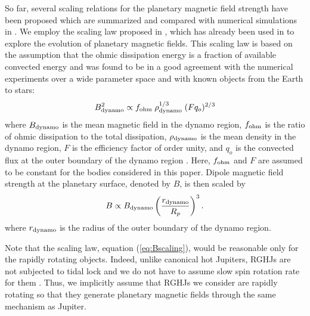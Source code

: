 \documentclass{emulateapj}
\def\memoYF#1{\color{red}$[${\bf #1}$]$ \color{black}}
\begin{document}
So far, several scaling relations for the planetary magnetic field strength  
have been proposed \citep[e.g.][]{russel1978,busse1976,stevenson1979,mizutani1992,sano1993,starchenko2002,christensen2006,christensen_et_al2009} %
which are summarized and compared with numerical simulations in \citet{christensen2010}. 
We employ the scaling law proposed in \citet{christensen_et_al2009}, which has already been used in \citet{reiners2010} to explore the evolution of planetary magnetic fields. This scaling law is based on the assumption that the ohmic dissipation energy is a fraction of available convected energy and was found to be in a good agreement with the numerical experiments over a wide parameter space and with known objects from the Earth to stars: 
\begin{equation}
B_{\rm dynamo} ^2 \propto f_{\rm ohm}\;\rho_{\rm dynamo}  ^{1/3} \;  (Fq_o)^{2/3} \label{eq:Bscaling} 
\end{equation}
where $B_{\rm dynamo}$ is the mean magnetic field in the dynamo region, $f_{\rm ohm}$ is the ratio of ohmic dissipation to the total dissipation, $\rho_{\rm dynamo} $ is the mean density in the dynamo region, $F$ is the efficiency factor of order unity, and $q_o$ is the convected flux at the outer boundary of the dynamo region \citep[see][for the comprehensive description]{christensen_et_al2009}. 
Here, $f_{\rm ohm}$ and $F$ are assumed to be constant for the bodies considered in this paper. 
Dipole magnetic field strength at the planetary surface, denoted by $B$, is then scaled by
\begin{equation}
B \propto B_{\rm dynamo} \left( \frac{r_{\rm dynamo}}{R_p} \right)^3.  \label{eq:Bscaling2}
\end{equation}
where $r_{\rm dynamo}$ is the radius of the outer boundary of the dynamo region. 

Note that the scaling law, equation (\ref{eq:Bscaling}), would be reasonable only for the rapidly rotating objects. Indeed, unlike canonical hot Jupiters, RGHJs are not subjected to tidal lock and we do not have to assume slow spin rotation rate for them \citep{spiegel+madhusudhan2012}. Thus, we implicitly assume that RGHJs we consider are rapidly rotating so that they generate  planetary magnetic fields through the same mechanism as Jupiter. 
\end{document}
